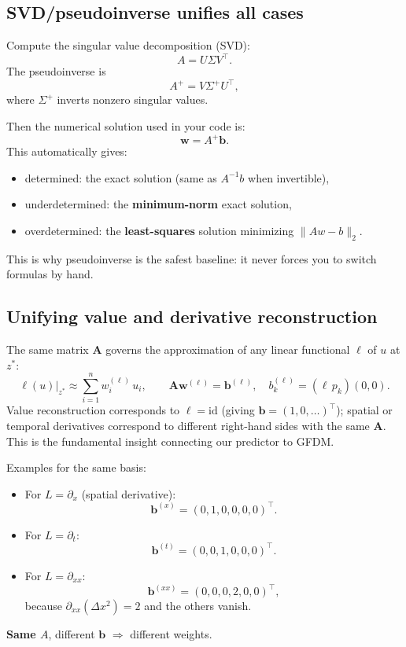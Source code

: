 \documentclass[12pt, a4paper, twoside]{report}
\theoremstyle{plain}
\theoremstyle{definition}
\newcommand{\bw}{\mathbf{w}}
\newcommand{\bA}{\mathbf{A}}
\newcommand{\bb}{\mathbf{b}}
\begin{document}
\subsection*{SVD/pseudoinverse unifies all cases}
Compute the singular value decomposition (SVD):
\[
A = U\Sigma V^\top.
\]
The pseudoinverse is
\[
A^+ = V\Sigma^+U^\top,
\]
where $\Sigma^+$ inverts nonzero singular values.

Then the numerical solution used in your code is:
\begin{equation}\label{eq:pinv-solve}
\bm w = A^+ \bm b.
\end{equation}
This automatically gives:
\begin{itemize} 
\item determined: the exact solution (same as $A^{-1}b$ when invertible),
\item underdetermined: the \textbf{minimum-norm} exact solution,
\item overdetermined: the \textbf{least-squares} solution minimizing $\|Aw-b\|_2$.
\end{itemize}
This is why pseudoinverse is the safest baseline: it never forces you to switch formulas by hand.


\subsection{Unifying value and derivative reconstruction}
\label{sec:unify}

The same matrix $\bA$ governs the approximation of any linear
functional $\ell$ of $u$ at $z^*$:
\begin{equation}
    \ell(u)\big|_{z^*} \approx \sum_{i=1}^n w_i^{(\ell)}\, u_i,
    \qquad
    \bA \bw^{(\ell)} = \bb^{(\ell)},
    \quad
    b_k^{(\ell)} = (\ell\, p_k)(0,0).
\end{equation}
Value reconstruction corresponds to $\ell = \mathrm{id}$ (giving
$\bb = (1,0,\ldots)^\top$); spatial or temporal derivatives
correspond to different right-hand sides with the same $\bA$.
This is the fundamental insight connecting our predictor to GFDM.


Examples for the same basis:
\begin{itemize} 
\item For $L=\partial_x$ (spatial derivative):
\[
\bm b^{(x)}
= (0,1,0,0,0,0)^\top.
\]
\item For $L=\partial_t$:
\[
\bm b^{(t)} = (0,0,1,0,0,0)^\top.
\]
\item For $L=\partial_{xx}$:
\[
\bm b^{(xx)}
= (0,0,0,2,0,0)^\top,
\]
because $\partial_{xx}(\Delta x^2)=2$ and the others vanish.
\end{itemize}
\textbf{Same $A$}, different $\bm b$ $\Rightarrow$ different weights.
\end{document}
